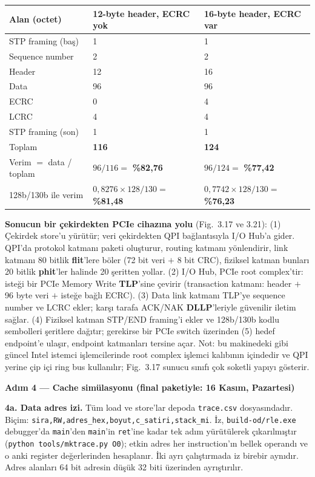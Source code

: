 \documentclass[11pt,a4paper]{article}
\newcommand{\tl}{\texttt}
\newcommand{\hd}[1]{\cellcolor{hdr}#1}
\begin{document}
\begin{longtable}{|p{5.0cm}|p{5.2cm}|p{5.3cm}|}
\hline
\hd{Alan (octet)} & \hd{12-byte header, ECRC yok} & \hd{16-byte header, ECRC var}\\
\hline
STP framing (baş) & 1 & 1\\ \hline
Sequence number & 2 & 2\\ \hline
Header & 12 & 16\\ \hline
Data & 96 & 96\\ \hline
ECRC & 0 & 4\\ \hline
LCRC & 4 & 4\\ \hline
STP framing (son) & 1 & 1\\ \hline
Toplam & \textbf{116} & \textbf{124}\\ \hline
Verim $=$ data / toplam & $96/116 = $ \textbf{\%82,76} & $96/124 = $ \textbf{\%77,42}\\ \hline
128b/130b ile verim & $0{,}8276 \times 128/130 = $ \textbf{\%81,48} & $0{,}7742 \times 128/130 = $ \textbf{\%76,23}\\ \hline
\end{longtable}

\textbf{Sonucun bir çekirdekten PCIe cihazına yolu} (Fig.~3.17 ve 3.21): (1) Çekirdek store'u
yürütür; veri çekirdekten QPI bağlantısıyla I/O Hub'a gider. QPI'da protokol katmanı paketi
oluşturur, routing katmanı yönlendirir, link katmanı 80 bitlik \textbf{flit}'lere böler (72 bit
veri $+$ 8 bit CRC), fiziksel katman bunları 20 bitlik \textbf{phit}'ler halinde 20 şeritten
yollar. (2) I/O Hub, PCIe root complex'tir: isteği bir PCIe Memory Write \textbf{TLP}'sine
çevirir (transaction katmanı: header $+$ 96 byte veri $+$ isteğe bağlı ECRC). (3) Data link
katmanı TLP'ye sequence number ve LCRC ekler; karşı tarafa ACK/NAK \textbf{DLLP}'leriyle
güvenilir iletim sağlar. (4) Fiziksel katman STP/END framing'i ekler ve 128b/130b kodlu
sembolleri şeritlere dağıtır; gerekirse bir PCIe switch üzerinden (5) hedef endpoint'e
ulaşır, endpoint katmanları tersine açar. Not: bu makinedeki gibi güncel Intel istemci
işlemcilerinde root complex işlemci kalıbının içindedir ve QPI yerine çip içi ring bus
kullanılır; Fig.~3.17 sunucu sınıfı çok soketli yapıyı gösterir.

\textbf{Adım 4 --- Cache simülasyonu (final paketiyle: 16 Kasım, Pazartesi)}

\textbf{4a. Data adres izi.} Tüm load ve store'lar depoda \tl{trace.csv} dosyasındadır.
Biçim: \tl{sira,RW,adres\_hex,boyut,c\_satiri,stack\_mi}. İz, \tl{build-od/rle.exe}
debugger'da \tl{main}'den \tl{main}'in \tl{ret}'ine kadar tek adım yürütülerek çıkarılmıştır
(\tl{python tools/mktrace.py O0}); etkin adres her instruction'ın bellek operandı
ve o anki register değerlerinden hesaplanır. İki ayrı çalıştırmada iz birebir aynıdır.
Adres alanları 64 bit adresin düşük 32 biti üzerinden ayrıştırılır.
\end{document}
